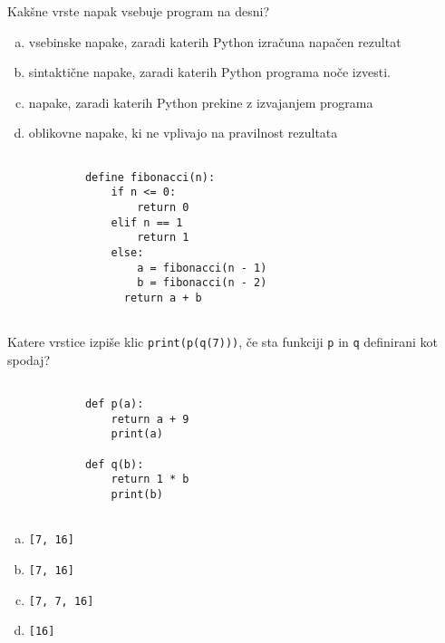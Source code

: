 \documentclass[arhiv, 10pt]{../izpit}
\newcommand{\inlinepy}[1]{\texttt{#1}}
\begin{document}
        \naloga*
        \begin{multicols}{2}
        \noindent
        Kakšne vrste napak vsebuje program na desni?

        \begin{enumerate}[(a)]
\item vsebinske napake, zaradi katerih Python izračuna napačen rezultat
\item sintaktične napake, zaradi katerih Python programa noče izvesti.
\item napake, zaradi katerih Python prekine z izvajanjem programa
\item oblikovne napake, ki ne vplivajo na pravilnost rezultata
\end{enumerate}

        \columnbreak

        \begin{verbatim}
        
            define fibonacci(n):
                if n <= 0:
                    return 0
                elif n == 1
                    return 1
                else:
                    a = fibonacci(n - 1)
                    b = fibonacci(n - 2)
                  return a + b
            
        \end{verbatim}

        \end{multicols}

    
        \naloga*
        Katere vrstice izpiše klic \inlinepy{print(p(q(7)))}, če sta funkciji \inlinepy{p} in \inlinepy{q} definirani kot spodaj?

        \begin{multicols}{2}
        \begin{verbatim}
        
            def p(a):
                return a + 9
                print(a)

            def q(b):
                return 1 * b
                print(b)
        
        \end{verbatim}

        \begin{enumerate}[(a)]
\item \inlinepy{[7, 16]}
\item \inlinepy{[7, 16]}
\item \inlinepy{[7, 7, 16]}
\item \inlinepy{[16]}
\end{enumerate}

        \end{multicols}
    
\end{document}
